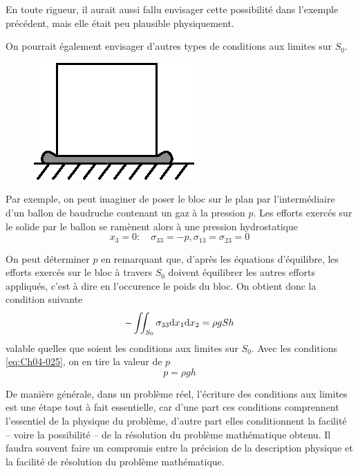 En toute rigueur, il aurait aussi fallu envisager cette possibilité dans l'exemple précédent, mais elle était peu plausible physiquement.

On pourrait également envisager d'autres types de conditions aux limites sur $S_0$.
\begin{figure}
    \begin{center}
        \includegraphics{../images/T1_Ch04-0006}
    \end{center}
\end{figure}
Par exemple, on peut imaginer de poser le bloc sur le plan par l'intermédiaire d'un ballon de baudruche contenant un gaz à la pression $p$.
Les efforts exercés sur le solide par le ballon se ramènent alors à une pression hydrostatique
\begin{equation}
    x_3 = 0: \quad \sigma_{33} =-p, \sigma_{13} = \sigma_{23} = 0
    \label{eq:Ch04-025}
\end{equation}

On peut déterminer $p$ en remarquant que, d'après les équations d'équilibre, les efforts exercés sur le bloc à travers $S_0$ doivent équili­brer les autres efforts appliqués, c'est à dire en l'occurence le poids du bloc.
On obtient donc la condition suivante
\begin{equation}
    -\iint_{S_0} \sigma_{33} \mathrm{d} x_1 \mathrm{d} x_2 = \rho g S h
    \label{eq:Ch04-026}
\end{equation}
valable quelles que soient les conditions aux limites sur $S_0$.
Avec les conditions \eqref{eq:Ch04-025}, on en tire la valeur de $p$
\begin{equation}
    p = \rho g h
    \label{eq:Ch04-027}
\end{equation}

De manière générale, dans un problème réel, l'écriture des conditions aux limites est une étape tout à fait essentielle, car d'une part ces conditions comprennent l'essentiel de la physique du problème, d'autre part elles conditionnent la facilité -- voire la possibilité -- de la résolution du problème mathématique obtenu.
Il faudra souvent faire un compromis entre la précision de la description physique et la facilité de résolution du problème mathématique.

